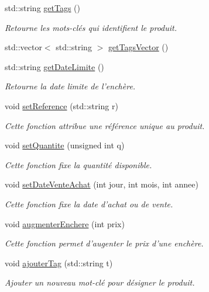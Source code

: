 \begin{DoxyCompactItemize}
std\-::string \hyperlink{class_produit_a7b44df89f061edee42a971f2c172965b}{get\-Tags} ()
\begin{DoxyCompactList}\small\item\em Retourne les mots-\/clés qui identifient le produit. \end{DoxyCompactList}\item 
std\-::vector$<$ std\-::string $>$ \hyperlink{class_produit_ab8b15ff1ad286eb2e8a8f9afae3194f1}{get\-Tags\-Vector} ()
\item 
std\-::string \hyperlink{class_produit_a7bd69ad69057b77be95569b597dc058d}{get\-Date\-Limite} ()
\begin{DoxyCompactList}\small\item\em Retourne la date limite de l'enchère. \end{DoxyCompactList}\item 
void \hyperlink{class_produit_a34da537b2544450854d932c2cb695d6d}{set\-Reference} (std\-::string r)
\begin{DoxyCompactList}\small\item\em Cette fonction attribue une référence unique au produit. \end{DoxyCompactList}\item 
void \hyperlink{class_produit_aee71ce4e667afde2773fea21c663d816}{set\-Quantite} (unsigned int q)
\begin{DoxyCompactList}\small\item\em Cette fonction fixe la quantité disponible. \end{DoxyCompactList}\item 
void \hyperlink{class_produit_a609f2dfcf93cc5a41ef69f3e4ed4598f}{set\-Date\-Vente\-Achat} (int jour, int mois, int annee)
\begin{DoxyCompactList}\small\item\em Cette fonction fixe la date d'achat ou de vente. \end{DoxyCompactList}\item 
void \hyperlink{class_produit_aed251a51ae5ae9a99b991024434edcfb}{augmenter\-Enchere} (int prix)
\begin{DoxyCompactList}\small\item\em Cette fonction permet d'augenter le prix d'une enchère. \end{DoxyCompactList}\item 
void \hyperlink{class_produit_a5edb1869a3001fb320047a78ea5e715a}{ajouter\-Tag} (std\-::string t)
\begin{DoxyCompactList}\small\item\em Ajouter un nouveau mot-\/clé pour désigner le produit. \end{DoxyCompactList}\item 

\end{DoxyCompactItemize}
